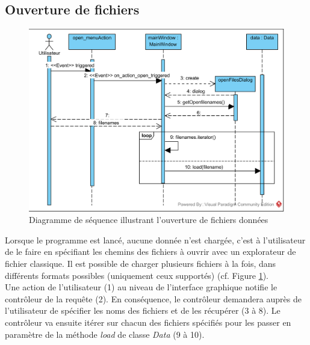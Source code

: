 \documentclass[12pt]{article}
\begin{document}
		\subsection{Ouverture de fichiers}
		\begin{figure}[!h]
		\begin{center}
		\includegraphics[scale=1]{dia_sequence_openFiles.png}
		\caption{Diagramme de séquence illustrant l’ouverture de fichiers données}
		\label{fig:seq_openFiles}
		\end{center}
		\end{figure}
			
		Lorsque le programme est lancé, aucune donnée n’est chargée, c’est à l’utilisateur de le faire en spécifiant les chemins des fichiers à ouvrir avec un explorateur de fichier classique. Il est possible de charger plusieurs fichiers à la fois, dans différents formats possibles (uniquement ceux supportés) (cf. Figure \ref{fig:seq_openFiles}).\\
	Une action de l’utilisateur (1) au niveau de l’interface graphique notifie le contrôleur de la requête (2). En conséquence, le contrôleur demandera auprès de l’utilisateur de spécifier les noms des fichiers et de les récupérer (3 à 8). Le contrôleur va ensuite itérer sur chacun des fichiers spécifiés pour les passer en paramètre de la méthode \textit{load} de classe \textit{Data} (9 à 10).
	
		\newpage
\end{document}
